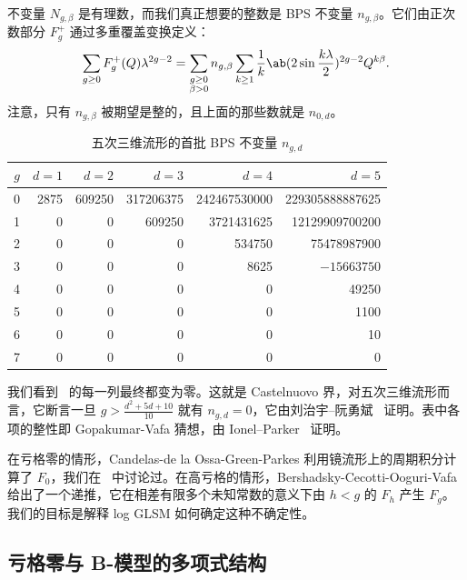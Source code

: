 \documentclass{amsart}
\theoremstyle{definition}
\theoremstyle{remark}
\theoremstyle{plain}
\theoremstyle{definition}
\theoremstyle{remark}
\newcommand{\1}{\mathbf{1}}
\newcommand{\2}{\mathbf{2}}
\newcommand{\3}{\mathbf{3}}
\begin{document}
不变量 \(N_{g,\beta}\) 是有理数，而我们真正想要的整数是 BPS 不变量 \(n_{g,\beta}\)。它们由正次数部分 \(F_g^+\) 通过多重覆盖变换定义：
\[ \sum_{g \geq 0} F_g^+(Q)\lambda^{2g-2} = \sum_{\substack{g \geq 0 \\ \beta > 0}} n_{g,\beta} \sum_{k \geq 1} \frac{1}{k} \ab(2 \sin \frac{k\lambda}{2})^{2g-2}Q^{k\beta}. \]
注意，只有 \(n_{g,\beta}\) 被期望是整的，且上面的那些数就是 \(n_{0,d}\)。

\begin{table}[htpb]
    \centering
    \caption{五次三维流形的首批 BPS 不变量 \(n_{g,d}\)}
    \label{tab:quinticbps}
    \begin{tabular}{crrrrr}
        \toprule
        \(g\) & \(d=1\) & \(d=2\) & \(d=3\) & \(d=4\) & \(d=5\) \\
        \midrule
        0 & 2875 & 609250 & 317206375 & 242467530000 & 229305888887625 \\
        1 & 0 & 0 & 609250 & 3721431625 & 12129909700200 \\
        2 & 0 & 0 & 0 & 534750 & 75478987900 \\
        3 & 0 & 0 & 0 & 8625 & \(-15663750\) \\
        4 & 0 & 0 & 0 & 0 & 49250 \\
        5 & 0 & 0 & 0 & 0 & 1100 \\
        6 & 0 & 0 & 0 & 0 & 10 \\
        7 & 0 & 0 & 0 & 0 & 0 \\
        \bottomrule
    \end{tabular}
\end{table}

我们看到~ 的每一列最终都变为零。这就是 Castelnuovo 界，对五次三维流形而言，它断言一旦 \(g > \frac{d^2+5d+10}{10}\) 就有 \(n_{g,d} = 0\)，它由刘治宇–阮勇斌~\cite{LiuRuanCastelnuovo} 证明。表中各项的整性即 Gopakumar-Vafa 猜想，由 Ionel--Parker~\cite{IonelParker2018} 证明。

在亏格零的情形，Candelas-de la Ossa-Green-Parkes 利用镜流形上的周期积分计算了 \(F_0\)，我们在~ 中讨论过。在高亏格的情形，Bershadsky-Cecotti-Ooguri-Vafa 给出了一个递推，它在相差有限多个未知常数的意义下由 \(h < g\) 的 \(F_h\) 产生 \(F_g\)。我们的目标是解释 log GLSM 如何确定这种不确定性。

\subsection{亏格零与 B-模型的多项式结构}%
\label{sub:Genus zero and the polynomial structure of the B-model}
\end{document}
